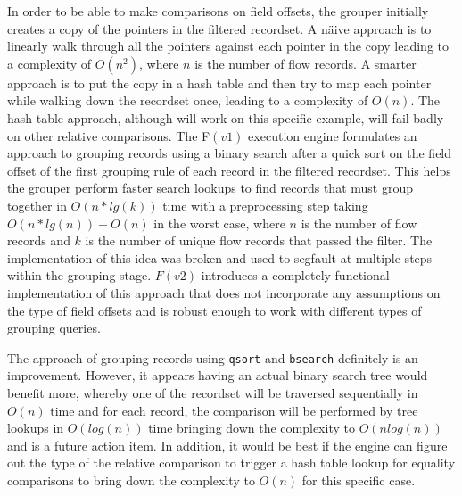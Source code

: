 In order to be able to make comparisons on field offsets, the grouper
initially creates a copy of the pointers in the filtered recordset. A n\"aive
approach is to linearly walk through all the pointers against each pointer in
the copy leading to a complexity of $O(n^2)$, where $n$ is the number of flow
records. A smarter approach is to put the copy in a hash table and then try to
map each pointer while walking down the recordset once, leading to a
complexity of $O(n)$. The hash table approach, although will work on this
specific example, will fail badly on other relative comparisons. The F$(v1)$
 execution engine
\cite{jschauer:thesis:2011} formulates an approach to grouping records using a
binary search after a quick sort on the field offset of the first grouping
rule of each record in the filtered recordset. This helps the grouper perform
faster search lookups to find records that must group together in $O(n*lg(k))$
time with a preprocessing step taking $O(n*lg(n)) + O(n)$ in the worst case,
where $n$ is the number of flow records and $k$ is the number of unique flow
records that passed the filter.  The implementation of this idea was broken
and used to segfault at multiple steps within the grouping stage.  $F(v2)$
introduces a completely functional implementation of this approach that does
not incorporate any assumptions on the type of field offsets and is robust
enough to work with different types of grouping queries.

The approach of grouping records using \texttt{qsort} and \texttt{bsearch}
definitely is an improvement. However, it appears having an actual binary
search tree would benefit more, whereby one of the recordset will be traversed
sequentially in $O(n)$ time and for each record, the comparison will be
performed by tree lookups in $O(log(n))$ time bringing down the complexity to
$O(nlog(n))$ and is a future action item. In  addition, it would be best if the engine can figure out the
type of the relative comparison to trigger a hash table lookup for equality
comparisons to bring down the complexity to $O(n)$ for this specific case.


